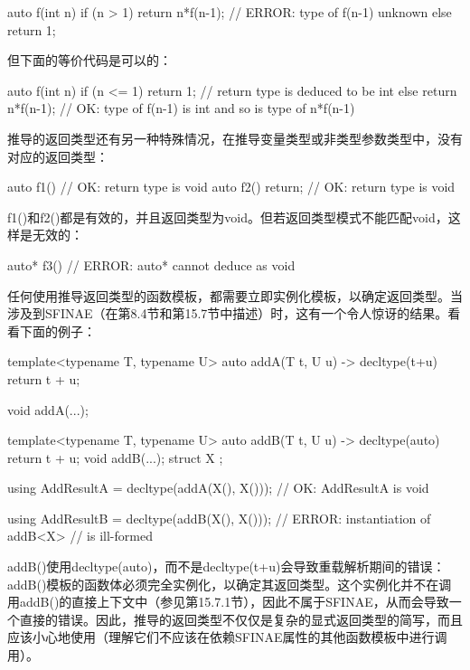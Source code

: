 \begin{cpp}
auto f(int n) {
	if (n > 1) {
		return n*f(n-1); // ERROR: type of f(n-1) unknown
	} else {
		return 1;
	}
}
\end{cpp}

但下面的等价代码是可以的：

\begin{cpp}
auto f(int n) {
	if (n <= 1) {
		return 1; // return type is deduced to be int
	} else {
		return n*f(n-1); // OK: type of f(n-1) is int and so is type of n*f(n-1)
	}
}
\end{cpp}

推导的返回类型还有另一种特殊情况，在推导变量类型或非类型参数类型中，没有对应的返回类型：

\begin{cpp}
auto f1() { } // OK: return type is void
auto f2() { return; } // OK: return type is void
\end{cpp}

f1()和f2()都是有效的，并且返回类型为void。但若返回类型模式不能匹配void，这样是无效的：

\begin{cpp}
auto* f3() {} // ERROR: auto* cannot deduce as void
\end{cpp}

任何使用推导返回类型的函数模板，都需要立即实例化模板，以确定返回类型。当涉及到SFINAE（在第8.4节和第15.7节中描述）时，这有一个令人惊讶的结果。看看下面的例子：

\begin{cpp}
template<typename T, typename U>
auto addA(T t, U u) -> decltype(t+u) {
	return t + u;
}

void addA(...);

template<typename T, typename U>
auto addB(T t, U u) -> decltype(auto) {
	return t + u;
}
void addB(...);
struct X {};

using AddResultA = decltype(addA(X(), X())); // OK: AddResultA is void

using AddResultB = decltype(addB(X(), X())); // ERROR: instantiation of addB<X>
// is ill-formed
\end{cpp}

addB()使用decltype(auto)，而不是decltype(t+u)会导致重载解析期间的错误：addB()模板的函数体必须完全实例化，以确定其返回类型。这个实例化并不在调用addB()的直接上下文中（参见第15.7.1节），因此不属于SFINAE，从而会导致一个直接的错误。因此，推导的返回类型不仅仅是复杂的显式返回类型的简写，而且应该小心地使用（理解它们不应该在依赖SFINAE属性的其他函数模板中进行调用）。

